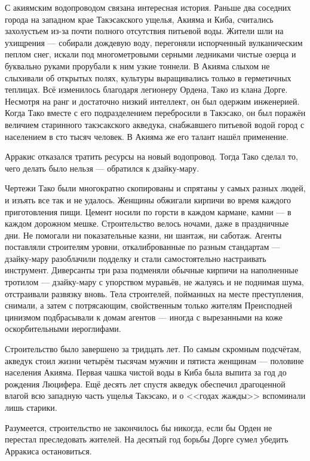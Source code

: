 С акиямским водопроводом связана интересная история.
Раньше два соседних города на западном крае Такэсакского ущелья, Акияма и Киба, считались захолустьем из-за почти полного отсутствия питьевой воды.
Жители шли на ухищрения --- собирали дождевую воду, перегоняли испорченный вулканическим пеплом снег, искали под многометровыми серными ледниками чистые озерца и буквально руками прорубали к ним узкие тоннели.
В Акияма слыхом не слыхивали об открытых полях, культуры выращивались только в герметичных теплицах.
Всё изменилось благодаря легионеру Ордена, Тако из клана Дорге.
Несмотря на ранг и достаточно низкий интеллект, он был одержим инженерией.
Когда Тако вместе с его подразделением перебросили в Такэсако, он был поражён величием старинного такэсакского акведука, снабжавшего питьевой водой город с населением в сто тысяч человек.
В Акияма же его талант нашёл применение.

Арракис отказался тратить ресурсы на новый водопровод.
Тогда Тако сделал то, чего делать было нельзя --- обратился к дзайку-мару.

Чертежи Тако были многократно скопированы и спрятаны у самых разных людей, и изъять все так и не удалось.
Женщины обжигали кирпичи во время каждого приготовления пищи.
Цемент носили по горсти в каждом кармане, камни --- в каждом дорожном мешке.
Строительство велось ночами, даже в праздничные дни.
Не помогали ни показательные казни, ни шантаж, ни саботаж.
Агенты поставляли строителям уровни, откалиброванные по разным стандартам --- дзайку-мару разоблачили подделку и стали самостоятельно настраивать инструмент.
Диверсанты три раза подменяли обычные кирпичи на наполненные тротилом --- дзайку-мару с упорством муравьёв, не жалуясь и не поднимая шума, отстраивали развязку вновь.
Тела строителей, пойманных на месте преступления, снимали, а затем с потрясающим, свойственным только жителям Преисподней цинизмом подбрасывали к домам агентов --- иногда с вырезанными на коже оскорбительными иероглифами.

Строительство было завершено за тридцать лет.
По самым скромным подсчётам, акведук стоил жизни четырём тысячам мужчин и пятиста женщинам --- половине населения Акияма.
Первая чашка чистой воды в Киба была выпита за год до рождения Люцифера.
Ещё десять лет спустя акведук обеспечил драгоценной влагой всю западную часть ущелья Такэсако, и о <<годах жажды>> вспоминали лишь старики.

Разумеется, строительство не закончилось бы никогда, если бы Орден не перестал преследовать жителей.
На десятый год борьбы Дорге сумел убедить Арракиса остановиться.

